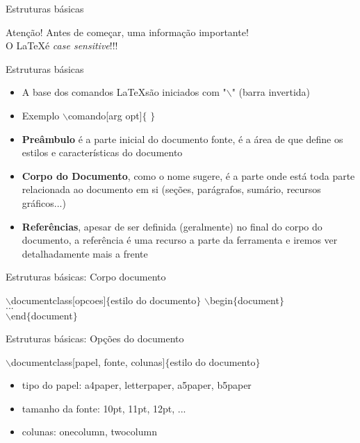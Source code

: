 \begin{frame}{Estruturas básicas}
    \begin{alertblock}{Atenção!}
        Antes de começar, uma informação importante!\\
        O \LaTeX é \textit{case sensitive}!!!
    \end{alertblock}
\end{frame}  

\begin{frame}{Estruturas básicas}
    \begin{itemize}
        \item A base dos comandos \LaTeX são iniciados com "$\backslash$"  (barra invertida)
        \item Exemplo $\backslash$comando[arg opt]$\{$ $\}$
        \item \textbf{Preâmbulo} é a parte inicial do documento fonte, é a área de que define os estilos e características do documento
        \item \textbf{Corpo do Documento}, como o nome sugere, é a parte onde está toda parte relacionada ao documento em si (seções, parágrafos, sumário, recursos gráficos...)
        \item \textbf{Referências}, apesar de ser definida (geralmente) no final do corpo do documento, a referência é uma recurso a parte da ferramenta e iremos ver detalhadamente mais a frente
    \end{itemize}
\end{frame}

\begin{frame}{Estruturas básicas: Corpo documento}
    \begin{block}{}
        $\backslash$documentclass[opcoes]$\{$estilo do documento$\}$
        $\backslash$begin$\{$document$\}$\\
        $...$\\
        $\backslash$end$\{$document$\}$
    \end{block}
\end{frame}

\begin{frame}{Estruturas básicas: Opções do documento}
    \begin{block}{}
        $\backslash$documentclass[papel, fonte, colunas]$\{$estilo do documento$\}$
    \end{block}
    \begin{itemize}
        \item tipo do papel: a4paper, letterpaper, a5paper, b5paper
        \item tamanho da fonte: 10pt, 11pt, 12pt, ...
        \item colunas: onecolumn, twocolumn
    \end{itemize}
\end{frame}


